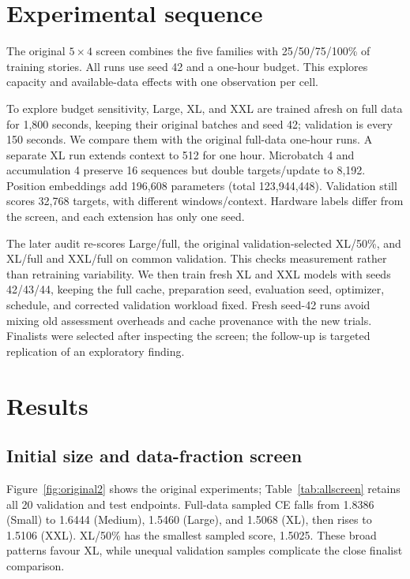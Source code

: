 \documentclass[10pt,twocolumn,letterpaper]{article}
\begin{document}
\section{Experimental sequence}

The original $5\times4$ screen combines the five families with 25/50/75/100\%
of training stories. All runs use seed 42 and a one-hour budget. This explores
capacity and available-data effects with one observation per cell.

To explore budget sensitivity, Large, XL, and XXL are trained afresh on full
data for 1,800 seconds, keeping their original batches and seed 42; validation
is every 150 seconds. We compare them with the original full-data one-hour
runs. A separate XL run extends context to 512 for one hour. Microbatch 4 and
accumulation 4 preserve 16 sequences but double targets/update to 8,192.
Position embeddings add 196,608 parameters (total 123,944,448). Validation still
scores 32,768 targets, with different windows/context. Hardware labels differ
from the screen, and each extension has only one seed.

The later audit re-scores Large/full, the original validation-selected XL/50\%,
and XL/full and XXL/full on common validation. This checks measurement rather
than retraining variability. We then train fresh XL and XXL models with seeds
42/43/44, keeping the full cache, preparation seed, evaluation seed, optimizer,
schedule, and corrected validation workload fixed. Fresh seed-42 runs avoid
mixing old assessment overheads and cache provenance with the new trials.
Finalists were selected after inspecting the screen; the follow-up is targeted
replication of an exploratory finding.

\section{Results}

\subsection{Initial size and data-fraction screen}

Figure~\ref{fig:original2} shows the original experiments; Table~\ref{tab:allscreen}
retains all 20 validation and test endpoints. Full-data sampled CE falls from
1.8386 (Small) to 1.6444 (Medium), 1.5460 (Large), and 1.5068 (XL), then rises
to 1.5106 (XXL). XL/50\% has the smallest sampled score, 1.5025. These broad
patterns favour XL, while unequal validation samples complicate the close
finalist comparison.
\end{document}
